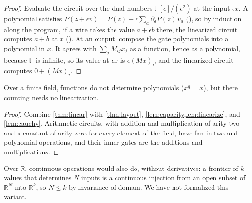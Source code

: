 \documentclass[11pt]{article}
\newcommand{\leanrefs}[1]{{\unskip\nobreak\hfil\penalty50\hskip1em\null\nobreak\hfil
  {\normalfont\small #1}\parfillskip=0pt\finalhyphendemerits=0\par}}
\newcommand{\leanref}[1]{\leanrefs{\lean{#1}}}
\theoremstyle{plain}
\theoremstyle{definition}
\theoremstyle{remark}
\newcommand{\R}{\mathbb{R}}
\newcommand{\F}{\mathbb{F}}
\newcommand{\Z}{\mathbb{Z}}
\begin{document}
\begin{proof}
Evaluate the circuit over the dual numbers $\F[\epsilon]/(\epsilon^2)$ at the input $\epsilon x$.
A polynomial satisfies $P(z + \epsilon v) = P(z) + \epsilon\sum_a \partial_a P(z)\, v_a$
(), so by induction along the program, if a wire takes the
value $a + \epsilon b$ there, the linearized circuit computes $a + b$ at $x$
(). At an output, compose the gate polynomials into a
polynomial in $x$. It agrees with $\sum_j M_{ij} x_j$ as a function, hence as a polynomial,
because $\F$ is infinite, so its value at $\epsilon x$ is $\epsilon (Mx)_i$, and the linearized
circuit computes $0 + (Mx)_i$.
\end{proof}

Over a finite field, functions do not determine polynomials ($x^q = x$), but there counting
needs no linearization.


\begin{proof}
Combine \cref{thm:linear} with \cref{thm:layout}, \cref{lem:capacity,lem:linearize}, and
\cref{lem:cauchy}. Arithmetic
circuits, with addition and multiplication of arity two and a constant of arity zero for every
element of the field, have fan-in two and polynomial operations, and their inner gates are the
additions and multiplications.
\end{proof}

\begin{remark}
\label{rem:continuous}
Over $\R$, continuous operations would also do, without derivatives: a frontier of $k$ values
that determines $N$ inputs is a continuous injection from an open subset of $\R^N$ into
$\R^k$, so $N \le k$ by invariance of domain. We have not formalized this variant.
\end{remark}
\end{document}
